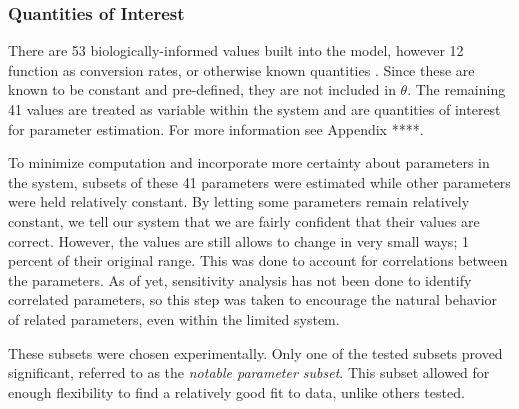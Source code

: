 \documentclass{article}
\begin{document}
\subsubsection{Quantities of Interest}
There are 53 biologically-informed values built into the model, however 12 function as conversion rates, or otherwise known quantities \cite{shtylla2019mathematical}. Since these are known to be constant and pre-defined, they are not included in $\theta$. The remaining 41 values are treated as variable within the system and are quantities of interest for parameter estimation. For more information see Appendix ****.
\par To minimize computation and incorporate more certainty about parameters in the system, subsets of these 41 parameters were estimated while other parameters were held relatively constant. By letting some parameters remain relatively constant, we tell our system that we are fairly confident that their values are correct. However, the values are still allows to change in very small ways; 1 percent of their original range. This was done to account for correlations between the parameters. As of yet, sensitivity analysis has not been done to identify correlated parameters, so this step was taken to encourage the natural behavior of related parameters, even within the limited system.
\par These subsets were chosen experimentally. Only one of the tested subsets proved significant, referred to as the \emph{notable parameter subset}. This subset allowed for enough flexibility to find a relatively good fit to data, unlike others tested.
\end{document}
